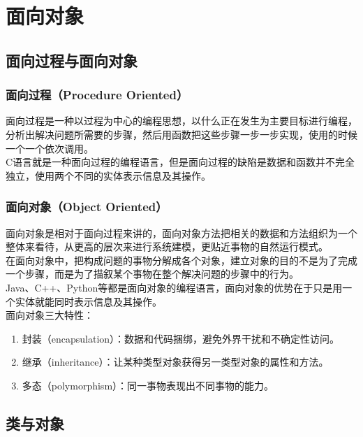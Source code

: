 \chapter{面向对象}

\section{面向过程与面向对象}

\subsection{面向过程（Procedure Oriented）}

面向过程是一种以过程为中心的编程思想，以什么正在发生为主要目标进行编程，分析出解决问题所需要的步骤，然后用函数把这些步骤一步一步实现，使用的时候一个一个依次调用。\\

C语言就是一种面向过程的编程语言，但是面向过程的缺陷是数据和函数并不完全独立，使用两个不同的实体表示信息及其操作。\\

\subsection{面向对象（Object Oriented）}

面向对象是相对于面向过程来讲的，面向对象方法把相关的数据和方法组织为一个整体来看待，从更高的层次来进行系统建模，更贴近事物的自然运行模式。\\

在面向对象中，把构成问题的事物分解成各个对象，建立对象的目的不是为了完成一个步骤，而是为了描叙某个事物在整个解决问题的步骤中的行为。\\

Java、C++、Python等都是面向对象的编程语言，面向对象的优势在于只是用一个实体就能同时表示信息及其操作。\\

面向对象三大特性：

\begin{enumerate}
	\item 封装（encapsulation）：数据和代码捆绑，避免外界干扰和不确定性访问。
	\item 继承（inheritance）：让某种类型对象获得另一类型对象的属性和方法。
	\item 多态（polymorphism）：同一事物表现出不同事物的能力。
\end{enumerate}

\newpage

\section{类与对象}

